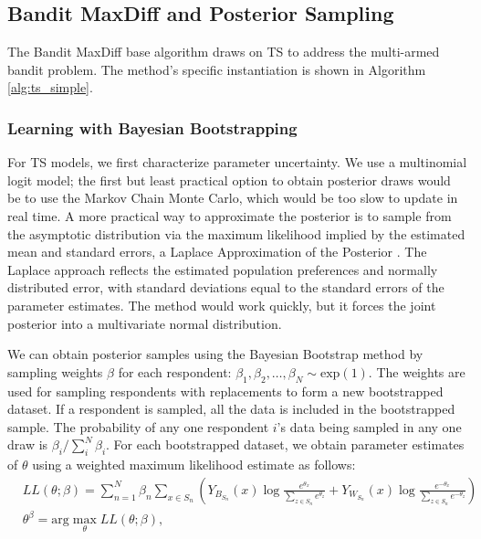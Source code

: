 \documentclass[nonblindrev]{informs3}
\begin{document}

\subsection{Bandit MaxDiff and Posterior Sampling} \label{sec:bmd_ts_edts}

The Bandit MaxDiff base algorithm draws on TS to address the multi-armed bandit problem. The method's specific instantiation is shown in Algorithm \ref{alg:ts_simple}.
  
\subsubsection{Learning with Bayesian Bootstrapping}

For TS models, we first characterize parameter uncertainty. We use a multinomial logit model; the first but least practical option to obtain posterior draws would be to use the Markov Chain Monte Carlo, which would be too slow to update in real time. A more practical way to approximate the posterior is to sample from the asymptotic distribution via the maximum likelihood implied by the estimated mean and standard errors, a Laplace Approximation of the Posterior \citep{tierney1986accurate}. The Laplace approach reflects the estimated population preferences and normally distributed error, with standard deviations equal to the standard errors of the parameter estimates. The method would work quickly, but it forces the joint posterior into a multivariate normal distribution. 

We can obtain posterior samples using the Bayesian Bootstrap method by sampling weights $\beta$ for each respondent: $\beta_1,\beta_2,\ldots,\beta_N \sim \text{exp}(1)$. The weights are used for sampling respondents with replacements to form a new bootstrapped dataset. If a respondent is sampled, all the data is included in the bootstrapped sample. The probability of any one respondent $i$'s data being sampled in any one draw is $\beta_i / \sum_{i}^{N}\beta_i$.  For each bootstrapped dataset, we obtain parameter estimates of $\theta$ using a weighted  maximum likelihood estimate as follows:
\begin{align}
&LL(\theta;\beta)=\sum_{n=1}^N \beta_n
\sum_{x \in S_n} 
	\left(
		Y_{B_{S_n}}(x)
		\log{\frac{e^{\theta_x}}{\sum_{z\in S_n} e^{\theta_z}}} 
		+ 
		Y_{W_{S_n}}(x)
		\log{\frac{e^{-\theta_x}}{\sum_{z\in S_n} e^{-\theta_z}}}
	\right) \\
&\theta^\beta = \text{arg}\max_{\theta} LL(\theta;\beta) ,
\end{align}
\end{document}
